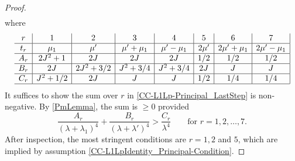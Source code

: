 \documentclass[12pt,psamsfonts]{amsart}
\theoremstyle{definition}
\theoremstyle{remark}
\numberwithin{equation}{section}
\begin{document}
\begin{proof}
\begin{equation}
\begin{aligned}
\end{aligned}
\label{CC-L1Lp-Principal_LastStep}
\end{equation}
where
\[
\begin{array}{c|c|c|c|c|c|c|c|c|c|c|c|c|c|}
r & 1 & 2 & 3 & 4 & 5 & 6 & 7 \\
\hline
t_r & \mu_1 & \mu' &  \mu' + \mu_1 & \mu'-\mu_1 & 2\mu'  & 2\mu' + \mu_1 &  2\mu' - \mu_1 \\
\hline
A_r & 2J^2 + 1 & 2J & 2J & 2J &  1/2 & 1/2 &  1/2 \\
\hline
B_r & 2J & 2J^2+3/2 & J^2 + 3/4 & J^2+3/4 & 2J & J & J
\\
\hline 
C_r &  J^2 + 1/2 & 2J & J & J & 1/2 & 1/4 & 1/4
\\
\hline 
\end{array}
\]
It suffices to show the sum over $r$ in \eqref{CC-L1Lp-Principal_LastStep} is non-negative. By \cref{PmLemma}, the sum is $\geq 0$ provided
\[
\frac{A_r}{(\lambda+\lambda_1)^4} + \frac{B_r}{(\lambda+\lambda')^4} > \frac{C_r}{ \lambda^4} \qquad \text{for $r=1,2,\dots,7.$}
\]
After inspection, the most stringent conditions are $r=1, 2$ and $5$, which are implied by assumption \eqref{CC-L1LpIdentity_Principal-Condition}. 
\end{proof}
\end{document}
